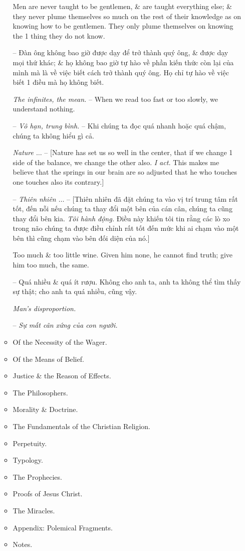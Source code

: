 \documentclass{article}
\begin{document}
\begin{enumerate}
\begin{itemize}
		 Men are never taught to be gentlemen, \& are taught everything else; \& they never plume themselves so much on the rest of their knowledge as on knowing how to be gentlemen. They only plume themselves on knowing the 1 thing they do not know.
		
		-- Đàn ông không bao giờ được dạy để trở thành quý ông, \& được dạy mọi thứ khác; \& họ không bao giờ tự hào về phần kiến thức còn lại của mình mà là về việc biết cách trở thành quý ông. Họ chỉ tự hào về việc biết 1 điều mà họ không biết.
		
		 {\it The infinites, the mean.} -- When we read too fast or too slowly, we understand nothing.
		
		-- {\it Vô hạn, trung bình.} -- Khi chúng ta đọc quá nhanh hoặc quá chậm, chúng ta không hiểu gì cả.
		
		 {\it Nature $\ldots$} -- [Nature has set us so well in the center, that if we change 1 side of the balance, we change the other also. {\it I act.} This makes me believe that the springs in our brain are so adjusted that he who touches one touches also its contrary.]
		
		-- {\it Thiên nhiên $\ldots$} -- [Thiên nhiên đã đặt chúng ta vào vị trí trung tâm rất tốt, đến nỗi nếu chúng ta thay đổi một bên của cán cân, chúng ta cũng thay đổi bên kia. {\it Tôi hành động.} Điều này khiến tôi tin rằng các lò xo trong não chúng ta được điều chỉnh rất tốt đến mức khi ai chạm vào một bên thì cũng chạm vào bên đối diện của nó.]
		
		 Too much \& too little wine. Given him none, he cannot find truth; give him too much, the same.
		
		-- Quá nhiều \& quá ít rượu. Không cho anh ta, anh ta không thể tìm thấy sự thật; cho anh ta quá nhiều, cũng vậy.
		
		 {\it Man's disproportion.}
		
		-- {\it Sự mất cân xứng của con người.}
		
		\item {\sf Of the Necessity of the Wager.}
		\item {\sf Of the Means of Belief.}
		\item {\sf Justice \& the Reason of Effects.}
		\item {\sf The Philosophers.}
		\item {\sf Morality \& Doctrine.}
		\item {\sf The Fundamentals of the Christian Religion.}
		\item {\sf Perpetuity.}
		\item {\sf Typology.}
		\item {\sf The Prophecies.}
		\item {\sf Proofs of Jesus Christ.}
		\item {\sf The Miracles.}
		\item {\sf Appendix: Polemical Fragments.}
		\item {\sf Notes.}
	\end{itemize}	
	

\end{enumerate}
\end{document}
